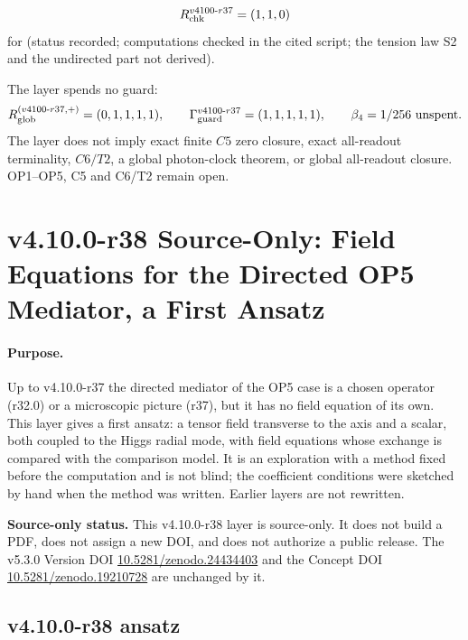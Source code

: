 \[
R_{\rm chk}^{v4100\text{-}r37}=(1,1,0)
\]
for (status recorded; computations checked in the cited script; the tension law S2 and the undirected part not derived).

The layer spends no guard:
\[
R_{\rm glob}^{(v4100\text{-}r37,+)}=(0,1,1,1,1),
\qquad
\Gamma_{\rm guard}^{v4100\text{-}r37}=(1,1,1,1,1),
\qquad
\beta_4=1/256\ \text{unspent}.
\]
The layer does not imply exact finite \(C5\) zero closure, exact all-readout terminality, \(C6/T2\), a global photon-clock theorem,
or global all-readout closure.  OP1--OP5, C5 and C6/T2 remain open.

\clearpage
\section*{v4.10.0-r38 Source-Only: Field Equations for the Directed OP5 Mediator, a First Ansatz}
\label{sec:v4100-r38-mediator-field-equation}

\paragraph{Purpose.}
Up to v4.10.0-r37 the directed mediator of the OP5 case is a chosen operator (r32.0) or a microscopic picture (r37), but it has no field
equation of its own.  This layer gives a first ansatz: a tensor field transverse to the axis and a scalar, both coupled to the Higgs radial
mode, with field equations whose exchange is compared with the comparison model.  It is an exploration with a method fixed before the
computation and is not blind; the coefficient conditions were sketched by hand when the method was written.  Earlier layers are not rewritten.

\noindent\textbf{Source-only status.}
This v4.10.0-r38 layer is source-only.  It does not build a PDF, does not assign a new DOI,
and does not authorize a public release.  The v5.3.0 Version DOI
\href{https://doi.org/10.5281/zenodo.24434403}{10.5281/zenodo.24434403} and the Concept DOI
\href{https://doi.org/10.5281/zenodo.19210728}{10.5281/zenodo.19210728} are unchanged by it.

\subsection*{v4.10.0-r38 ansatz}
\label{subsec:v4100-r38-ansatz}

